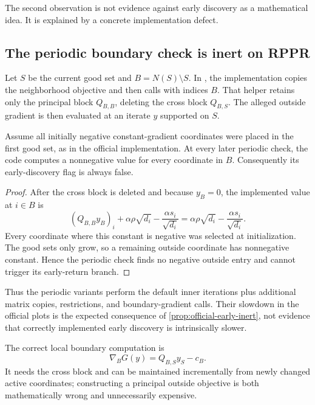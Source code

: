 \documentclass[11pt]{article}
\begin{document}
The second observation is not evidence against early discovery as a
mathematical idea.  It is explained by a concrete implementation defect.

\subsection{The periodic boundary check is inert on RPPR}

Let $S$ be the current good set and $B=N(S)\setminus S$.  In
, the implementation copies
the neighborhood objective and then calls
 with indices $B$.  That helper
retains only the principal block $Q_{B,B}$, deleting the cross block
$Q_{B,S}$.  The alleged outside gradient is then evaluated at an iterate
$y$ supported on $S$.

\begin{proposition}
\label{prop:official-early-inert}
Assume all initially negative constant-gradient coordinates were placed in
the first good set, as in the official implementation.  At every later
periodic check, the code computes a nonnegative value for every coordinate in
$B$.  Consequently its early-discovery flag is always false.
\end{proposition}

\begin{proof}
After the cross block is deleted and because $y_B=0$, the implemented value at
$i\in B$ is
\[
 (Q_{B,B}y_B)_i+
 \alpha\rho\sqrt{d_i}-\frac{\alpha s_i}{\sqrt{d_i}}
 =
 \alpha\rho\sqrt{d_i}-\frac{\alpha s_i}{\sqrt{d_i}}.
\]
Every coordinate where this constant is negative was selected at
initialization.  The good sets only grow, so a remaining outside coordinate
has nonnegative constant.  Hence the periodic check finds no negative outside
entry and cannot trigger its early-return branch.
\end{proof}

Thus the periodic variants perform the default inner iterations plus
additional matrix copies, restrictions, and boundary-gradient calls.  Their
slowdown in the official plots is the expected consequence of
\cref{prop:official-early-inert}, not evidence that correctly implemented
early discovery is intrinsically slower.

The correct local boundary computation is
\[
 \nabla_B G(y)=Q_{B,S}y_S-c_B.
\]
It needs the cross block and can be maintained incrementally from newly
changed active coordinates; constructing a principal outside objective is
both mathematically wrong and unnecessarily expensive.
\end{document}
